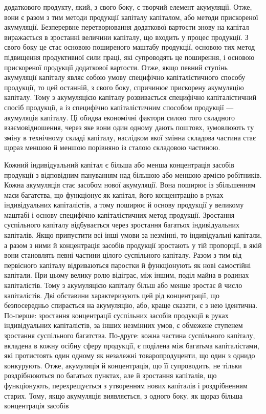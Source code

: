 \parcont{}  %
додаткового продукту, який, з свого боку, є творчий елемент
акумуляції. Отже, вони є разом з тим методи продукції капіталу
капіталом, або методи прискореної акумуляції. Безперервне
перетворювання додаткової вартости знову на капітал виражається
в зростанні величини капіталу, що входить у процес продукції.
З свого боку це стає основою поширеного маштабу продукції,
основою тих метод підвищення продуктивної сили праці,
які супроводять це поширення, і основою прискореної продукції
додаткової вартости. Отже, якщо певний ступінь акумуляції
капіталу являє собою умову специфічно капіталістичного способу
продукції, то цей останній, з свого боку, спричинює прискорену
акумуляцію капіталу. Тому з акумуляцією капіталу розвивається
специфічно капіталістичний спосіб продукції, а із специфічно
капіталістичним способом продукції — акумуляція капіталу.
Ці обидва економічні фактори силою того складного взаємовідношення,
через яке вони один одному дають поштовх,
зумовлюють ту зміну в технічному складі капіталу, наслідком
якої змінна складова частина стає щораз меншою й меншою порівняно
із сталою складовою частиною.

Кожний індивідуальний капітал є більша або менша концентрація
засобів продукції з відповідним пануванням над більшою
або меншою армією робітників. Кожна акумуляція стає засобом
нової акумуляції. Вона поширює із збільшенням маси багатства,
що функціонує як капітал, його концентрацію в руках індивідуальних
капіталістів, а тому поширює й основу продукції
у великому маштабі і основу специфічно капіталістичних метод
продукції. Зростання суспільного капіталу відбувається через
зростання багатьох індивідуальних капіталів. Якщо припустити
всі інші умови за незмінні, то індивідуальні капітали, а разом
з ними й концентрація засобів продукції зростають у тій пропорції,
в якій вони становлять певні частини цілого суспільного
капіталу. Разом з тим від первісного капіталу відриваються
паростки й функціонують як нові самостійні капітали. При цьому
велику ролю відіграє, між іншим, поділ майна в родинах капіталістів.
Тому з акумуляцією капіталу більш або менше зростає
й число капіталістів. Дві обставини характеризують цей рід
концентрації, що безпосередньо спирається на акумуляцію,
або, краще сказати, є з нею ідентична. По-перше: зростання концентрації
суспільних засобів продукції в руках індивідуальних
капіталістів, за інших незмінних умов, є обмежене ступенем
зростання суспільного багатства. По-друге: кожна частина суспільного
капіталу, вкладена в кожну осібну сферу продукції,
є поділена між багатьма капіталістами, які протистоять один
одному як незалежні товаропродуценти, що один з однидо конкурують.
Отже, акумуляція й концентрація, що її супроводить,
не тільки роздрібнюються по багатьох пунктах, але й зростання
капіталів, що функціонують, перехрещується з утворенням нових
капіталів і роздрібненням старих. Тому, якщо акумуляція виявляється,
з одного боку, як щораз більша концентрація засобів
\parbreak{}  %
